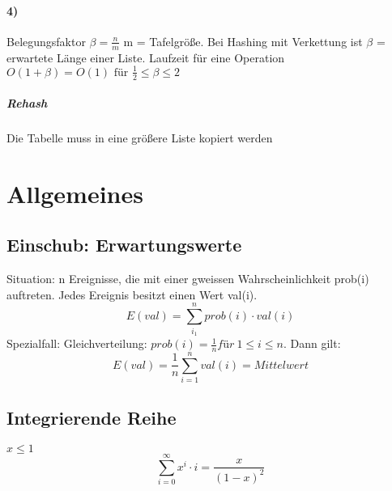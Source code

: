 \paragraph{4)} Belegungsfaktor $ \beta = \frac{n}{m} $ m = Tafelgröße. Bei Hashing mit Verkettung ist $ \beta $ = erwartete Länge einer Liste. Laufzeit für eine Operation $ O(1+\beta) = O(1) \text{ für } \frac{1}{2} \leq \beta \leq 2$ 
\subparagraph{Rehash} Die Tabelle muss in eine größere Liste kopiert werden \\
\begin{algorithm}[H]

\end{algorithm}








\section{Allgemeines}
\subsection{Einschub: Erwartungswerte}
Situation: n Ereignisse, die mit einer gweissen Wahrscheinlichkeit prob(i) auftreten. Jedes Ereignis besitzt einen Wert val(i). 
$$E(val) = \sum_{i_1}^{n} prob(i)\cdot val(i) $$
Spezialfall: Gleichverteilung: $ prob(i)=\frac{1}{n} für\ 1\leq i \leq n $. Dann gilt:
$$ E(val)= \frac{1}{n} \sum_{i=1}^{n}val(i) = Mittelwert $$

\subsection{Integrierende Reihe}
$ x \leq 1 $
$$ \sum_{i=0}^\infty x^i \cdot i = \frac{x}{(1-x)^2}$$







